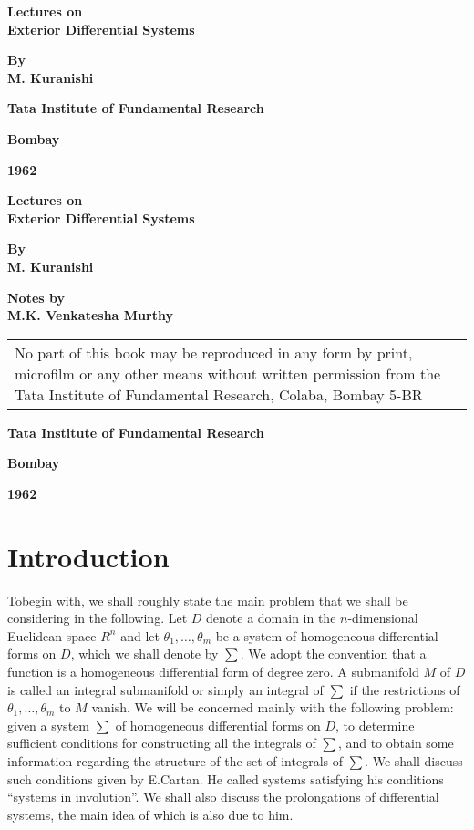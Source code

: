 \thispagestyle{empty}

\begin{center}
  \textbf{\Large Lectures on}\\[5pt]
  \textbf{\Large Exterior Differential Systems}
  \vskip 1cm

  {\bf By}\\
  {\large\bf M. Kuranishi}
  \vfill

  {\bf Tata Institute of Fundamental Research}

  {\bf Bombay}

  {\bf 1962}
\end{center}
\eject

\thispagestyle{empty}


\begin{center}
  \textbf{\Large Lectures on}\\[5pt]
  \textbf{\Large Exterior Differential Systems}
\vskip 1cm

  {\bf By}\\
  {\large\bf M. Kuranishi}
\vfill

{\bf Notes by}\\
{\large\bf  M.K. Venkatesha Murthy}\\
  \vfill

  \begin{tabular}{p{8.5cm}}
    No part of this book may be reproduced in any form by print,
    microfilm or any other means without written permission from the
    Tata Institute of Fundamental Research, Colaba, Bombay 5-BR 
  \end{tabular}

  \vfill
  {\bf Tata Institute of Fundamental Research}

  {\bf Bombay}

  {\bf 1962}
\end{center}




\chapter{Introduction}

To\pageoriginale begin with,  we shall roughly state the main problem that we shall
be considering in the following. Let $D$ denote a domain in the
$n$-dimen\-sional Euclidean space $R^n$ and let $\theta_1,  \ldots,
\theta_m$ be a system of homogeneous differential forms on $D$,  which
we shall denote by $\sum$. We adopt the convention that a function is
a homogeneous differential form of degree zero. A submanifold $M$ of
$D$ is called an integral submanifold or simply an integral of $\sum$
if the restrictions of $\theta_1, \ldots,  \theta_m$ to $M$ vanish. We
will be concerned mainly with the following problem: given a system
$\sum$ of homogeneous differential forms on $D$,  to determine
sufficient conditions for constructing all the integrals of $\sum$,
and to obtain some information regarding the structure of the set of
integrals of $\sum$. We shall discuss such conditions given by
E.Cartan. He called systems satisfying his conditions ``systems in
involution''. We shall also discuss the prolongations of differential
systems,  the main idea of which is also due to him. 

